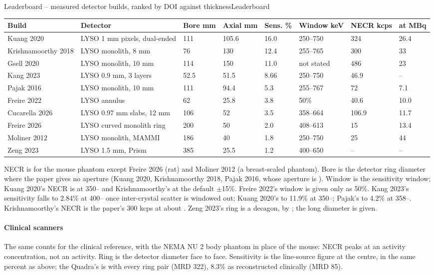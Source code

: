\begin{programnote}{Leaderboard -- measured detector builds, ranked by DOI against thickness}{Leaderboard}
\begin{center}
\begin{scriptsize}
\setlength{\tabcolsep}{2pt}
\begin{tabular}{llllllll}
\hline
Build & Detector & Bore mm & Axial mm & Sens. \% & Window keV & NECR kcps & at MBq \\
\hline
Kuang 2020 & LYSO 1 mm pixels, dual-ended & 111 & 105.6 & 16.0 & 250--750 & 324 & 26.4 \\
Krishnamoorthy 2018 & LYSO monolith, 8 mm & 76 & 130 & 12.4 & 255--765 & 300 & 33 \\
Gsell 2020 & LYSO monolith, 10 mm & 114 & 150 & 11.0 & not stated & 486 & 23 \\
Kang 2023 & LYSO 0.9 mm, 3 layers & 52.5 & 51.5 & 8.66 & 250--750 & 46.9 & -- \\
Pajak 2016 & LYSO monolith, 10 mm & 111 & 94.4 & 5.3 & 255--767 & 72 & 7.1 \\
Freire 2022 & LYSO annulus & 62 & 25.8 & 3.8 & 50\% & 40.6 & 10.0 \\
Cucarella 2026 & LYSO 0.97 mm slabs, 12 mm & 106 & 52 & 3.5 & 358--664 & 106.9 & 11.7 \\
Freire 2026 & LYSO curved monolith ring & 200 & 50 & 2.0 & 408--613 & 15 & 13.4 \\
Moliner 2012 & LYSO monolith, MAMMI & 186 & 40 & 1.8 & 250--750 & 25 & 44 \\
Zeng 2023 & LYSO 1.5 mm, Prism & 385 & 25.5 & 1.2 & 400--650 & -- & -- \\
\hline
\end{tabular}
\end{scriptsize}
\end{center}
NECR is for the mouse phantom except Freire 2026 (rat) and Moliner 2012 (a
 breast-scaled phantom). Bore is the detector ring
diameter where the paper gives no aperture (Kuang 2020, Krishnamoorthy 2018,
Pajak 2016, whose aperture is ). Window is the sensitivity window; Kuang
2020's NECR is at 350-- and Krishnamoorthy's at the default $\pm$15\%.
Freire 2022's window is given only as 50\%. Kang 2023's sensitivity
falls to 2.84\% at 400-- once inter-crystal scatter is windowed out;
Kuang 2020's to 11.9\% at 350--; Pajak's to 4.2\% at 358--.
Krishnamoorthy's NECR is the paper's 300 kcps at about . Zeng 2023's
ring is a decagon,  by ; the long diameter is given.

\paragraph{Clinical scanners}
The same counts for the clinical reference, with the NEMA NU 2 body phantom in
place of the mouse: NECR peaks at an activity concentration, not an activity.
Ring is the detector diameter face to face. Sensitivity is the line-source
figure at the centre, in the same percent as above; the Quadra's is with every
ring pair (MRD 322), 8.3\% as reconstructed clinically (MRD 85).


\end{programnote}
